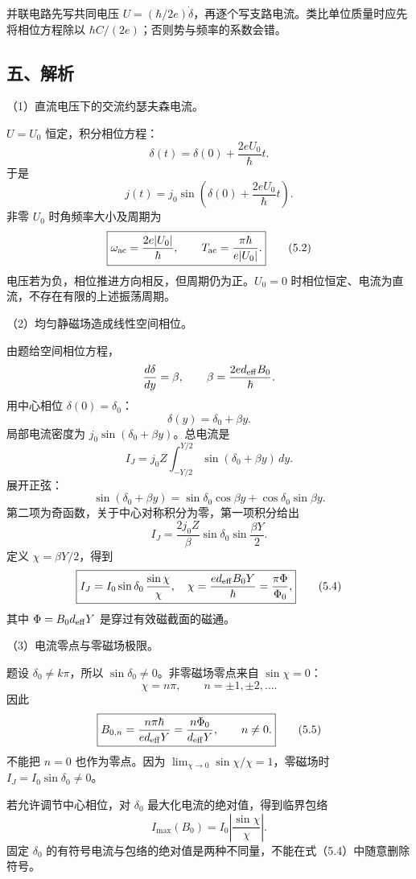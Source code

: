 \documentclass[12pt,a4paper,fontset=fandol]{ctexart}
\begin{document}
并联电路先写共同电压
\(U=(\hbar/2e)\dot\delta\)，再逐个写支路电流。类比单位质量时应先将相位方程除以
\(\hbar C/(2e)\)；否则势与频率的系数会错。

\subsection{五、解析}\label{ux4e94ux89e3ux6790-4}

（1）直流电压下的交流约瑟夫森电流。

\(U=U_0\) 恒定，积分相位方程： \[
\delta(t)=\delta(0)+\frac{2eU_0}{\hbar}t.
\] 于是 \[
\boxed{j(t)=j_0\sin\!\left(\delta(0)+\frac{2eU_0}{\hbar}t\right).}\tag{5.1}
\] 非零 \(U_0\) 时角频率大小及周期为 \[
\boxed{\omega_{\rm ac}=\frac{2e|U_0|}{\hbar},\qquad
T_{\rm ac}=\frac{\pi\hbar}{e|U_0|}.}\tag{5.2}
\] 电压若为负，相位推进方向相反，但周期仍为正。\(U_0=0\)
时相位恒定、电流为直流，不存在有限的上述振荡周期。

（2）均匀静磁场造成线性空间相位。

由题给空间相位方程， \[
\frac{d\delta}{dy}=\beta,\qquad
\beta=\frac{2ed_{\rm eff}B_0}{\hbar}.
\] 用中心相位 \(\delta(0)=\delta_0\)： \[
\boxed{\delta(y)=\delta_0+\beta y.}\tag{5.3}
\] 局部电流密度为 \(j_0\sin(\delta_0+\beta y)\)。总电流是 \[
I_J=j_0Z\int_{-Y/2}^{Y/2}\sin(\delta_0+\beta y)\,dy.
\] 展开正弦： \[
\sin(\delta_0+\beta y)
=\sin\delta_0\cos\beta y+\cos\delta_0\sin\beta y.
\] 第二项为奇函数，关于中心对称积分为零，第一项积分给出 \[
I_J=\frac{2j_0Z}{\beta}\sin\delta_0\sin\frac{\beta Y}{2}.
\] 定义 \(\chi=\beta Y/2\)，得到 \[
\boxed{I_J=I_0\sin\delta_0\,\frac{\sin\chi}{\chi},
\quad \chi=\frac{ed_{\rm eff}B_0Y}{\hbar}
=\frac{\pi\Phi}{\Phi_0},}\tag{5.4}
\] 其中 \(\Phi=B_0d_{\rm eff}Y\) 是穿过有效磁截面的磁通。

（3）电流零点与零磁场极限。

题设 \(\delta_0\ne k\pi\)，所以 \(\sin\delta_0\ne0\)。非零磁场零点来自
\(\sin\chi=0\)： \[
\chi=n\pi,\qquad n=\pm1,\pm2,\ldots.
\] 因此 \[
\boxed{B_{0,n}=\frac{n\pi\hbar}{ed_{\rm eff}Y}
=\frac{n\Phi_0}{d_{\rm eff}Y},\qquad n\ne0.}\tag{5.5}
\] 不能把 \(n=0\) 也作为零点。因为
\(\lim_{\chi\to0}\sin\chi/\chi=1\)，零磁场时
\(I_J=I_0\sin\delta_0\ne0\)。

若允许调节中心相位，对 \(\delta_0\) 最大化电流的绝对值，得到临界包络 \[
I_{\max}(B_0)=I_0\left|\frac{\sin\chi}{\chi}\right|.
\] 固定 \(\delta_0\)
的有符号电流与包络的绝对值是两种不同量，不能在式（5.4）中随意删除符号。
\end{document}
